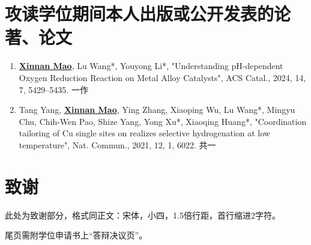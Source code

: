 \chapter{攻读学位期间本人出版或公开发表的论著、论文}
{
\setlist[enumerate]{}%
\begin{enumerate}[nosep]
    \item \textbf{\underline{Xinnan Mao}}, Lu Wang*, Youyong Li*, "Understanding pH-dependent Oxygen Reduction Reaction on Metal Alloy Catalysts", ACS Catal., 2024, 14, 7, 5429--5435. 一作
    \item Tang Yang\dag, \textbf{\underline{Xinnan Mao}\dag}, Ying Zhang, Xiaoping Wu, Lu Wang*, Mingyu Chu, Chih-Wen Pao, Shize Yang, Yong Xu*, Xiaoqing Huang*, "Coordination tailoring of Cu single sites on  realizes selective  hydrogenation at low temperature", Nat. Commun., 2021, 12, 1, 6022. 共一
\end{enumerate}
}

\chapter{致\quad 谢}

此处为致谢部分，格式同正文：宋体，小四，1.5倍行距，首行缩进2字符。

尾页需附学位申请书上“答辩决议页”。
